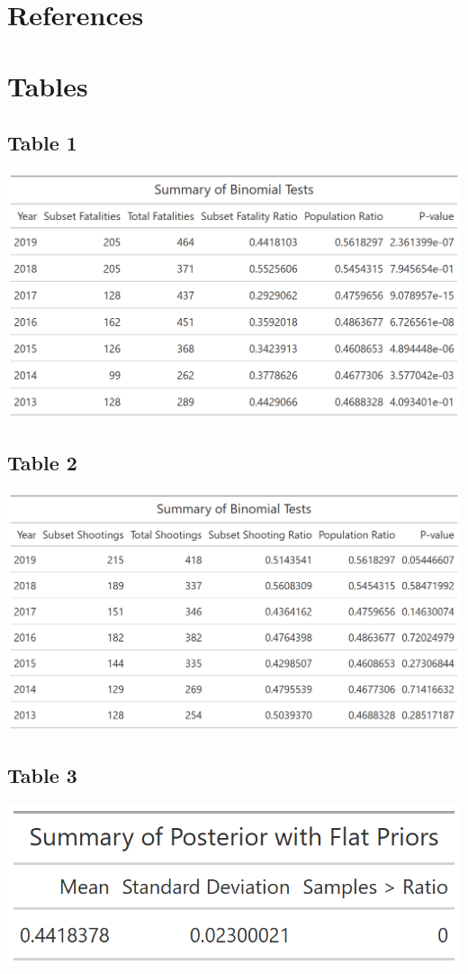 \documentclass{article}
\begin{document}
\section{References}



\section{Tables}
\subsection{Table 1}
 \includegraphics[scale=.4]{Table1.png}\label{Table 1}
 
\subsection{Table 2}
\includegraphics[scale=.4]{Table2.png}\label{Table 2}
 
\subsection{Table 3}
\begin{center}
\includegraphics[scale=.5]{Table3.png}\label{Table 3}
\end{center}
\end{document}
